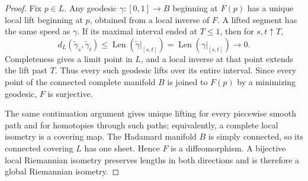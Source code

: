 \documentclass[10pt]{article}
\theoremstyle{plain}
\theoremstyle{definition}
\theoremstyle{remark}
\begin{document}
\begin{proof}
Fix \(p\in L\).  Any geodesic \(\gamma:[0,1]\to B\) beginning at \(F(p)\)
has a unique local lift beginning at \(p\), obtained from a local inverse of
\(F\).  A lifted segment has the same speed as \(\gamma\).  If its maximal
interval ended at \(T\le1\), then for \(s,t\uparrow T\),
\[
  d_L(\widetilde\gamma_s,\widetilde\gamma_t)
  \le \operatorname{Len}(\widetilde\gamma|_{[s,t]})
  =\operatorname{Len}(\gamma|_{[s,t]})\longrightarrow0.
\]
Completeness gives a limit point in \(L\), and a local inverse at that point
extends the lift past \(T\).  Thus every such geodesic lifts over its entire
interval.  Since every point of the connected complete manifold \(B\) is
joined to \(F(p)\) by a minimizing geodesic, \(F\) is surjective.

The same continuation argument gives unique lifting for every piecewise
smooth path and for homotopies through such paths; equivalently, a complete
local isometry is a covering map.  The Hadamard manifold \(B\) is simply
connected, so its connected covering \(L\) has one sheet.  Hence \(F\) is a
diffeomorphism.  A bijective local Riemannian isometry preserves lengths in
both directions and is therefore a global Riemannian isometry.
\end{proof}
\end{document}
